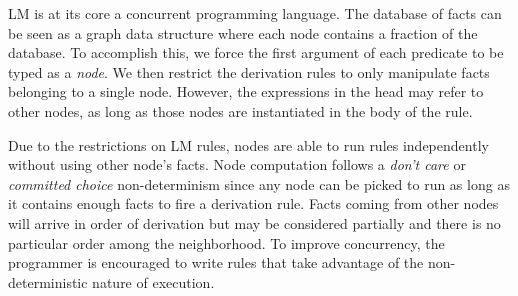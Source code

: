 LM is at its core a concurrent programming language.
The database of facts can be seen as a graph data structure where each node contains a fraction of the database.
To accomplish this, we force the first argument of each predicate to be typed as a \emph{node}. We then
restrict the derivation rules to only manipulate facts belonging to a single node.
However, the expressions in the head may refer to other nodes, as long as those nodes are instantiated in the body of the rule.

Due to the restrictions on LM rules, nodes are able to
run rules independently without using other node's facts. Node computation follows a
\emph{don't care} or \emph{committed choice} non-determinism
since any node can be picked to run as long as it contains enough facts to fire a derivation rule.
Facts coming from other nodes will arrive in order of derivation but may be considered
partially and there is no particular order among the neighborhood. To improve concurrency,
the programmer is encouraged to write rules that take advantage of the non-deterministic nature of execution.

